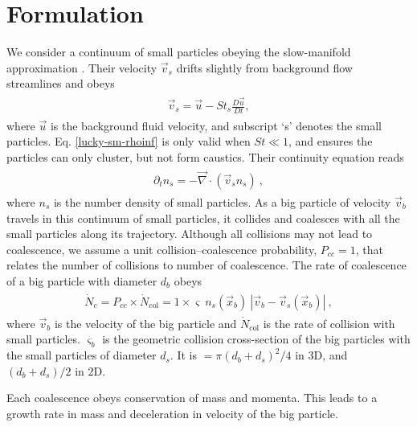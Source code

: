 \documentclass[../Rajarshi-thesis-draft.tex]{subfiles}
\begin{document}
\section{Formulation}\label{modl-form}
We consider a continuum of small particles obeying the slow-manifold approximation \cite{falkovich2002}.  Their velocity $\vec{v}_s$ drifts slightly from background flow streamlines and obeys
\begin{align}
\label{lucky-sm-rhoinf}
\begin{split}
    \vec{v}_s = \vec{u} - St_s \frac{D\vec{u}}{ Dt},
\end{split}
\end{align}
where $\vec{u}$ is the background fluid velocity, and subscript `s' denotes the small particles. Eq. \eqref{lucky-sm-rhoinf} is only valid when $St \ll 1$, and ensures the particles can only cluster, but not form caustics. Their continuity equation reads
\begin{align}
\label{lucky-n_sm}
\begin{split}
    \partial_t n_s = - \vec{\nabla}\cdot (\vec{v}_s n_s) \ ,
\end{split}
\end{align}
where $n_s$ is the number density of small particles. 
As a big particle of velocity $\vec{v}_b$ travels in this continuum of small particles, it collides and coalesces with all the small particles along its trajectory. Although all collisions may not lead to coalescence, we assume a unit collision–coalescence probability, $P_{cc} = 1$, that relates the number of collisions to number of coalescence. The rate of coalescence of a big particle with diameter $d_b$ obeys
\begin{align}
\begin{split}
    \dot{N}_c = P_{cc}\times \dot{N}_\text{col} = 1 \times \varsigma ~ n_s(\vec{x}_b) ~ |\vec{v}_b - \vec{v}_s(\vec{x}_b)| \ ,
\end{split}
\end{align}
where $\vec{v}_b$ is the velocity of the big particle and $\dot{N}_\text{col}$ is the rate of collision with small particles. $\varsigma_b$ is the geometric collision cross-section of the big particles with the small particles of diameter $d_s$. It is $= \pi(d_b + d_s)^2/4$ in $3$D, and $(d_b + d_s)/2$ in $2$D.


Each coalescence obeys conservation of mass and momenta. This leads to a growth rate in mass and deceleration in velocity of the big particle.
\end{document}
